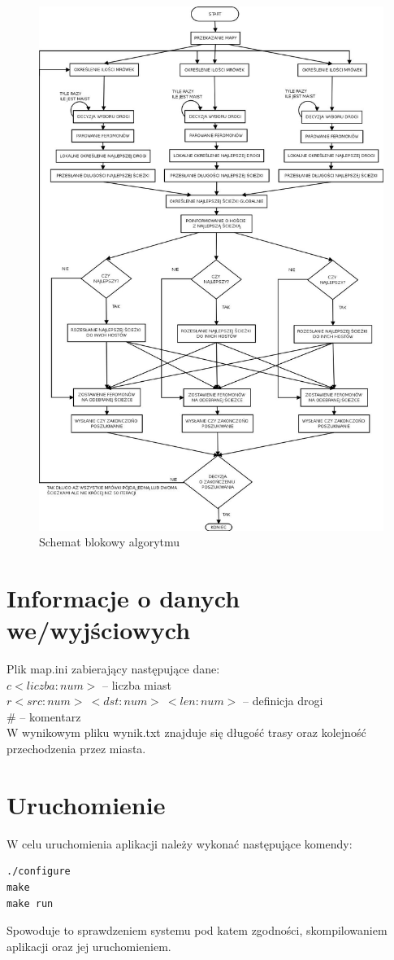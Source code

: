 \documentclass[12pt,a4paper]{article}
\begin{document}
\begin{figure}
\vspace{-4.5cm}
\caption{Schemat blokowy algorytmu}
\label{fig:schemat}
\hspace{-2cm}
\includegraphics[scale=0.5]{schemat.png}
\end{figure}
\section{Informacje o danych we/wyjściowych}
Plik map.ini zabierający następujące dane:\\
$c <liczba:num>$ -- liczba miast\\
$r <src:num>\ <dst:num>\ <len:num>$ -- definicja drogi\\
$\#$ -- komentarz\\
W wynikowym pliku wynik.txt znajduje się długość trasy oraz kolejność przechodzenia przez miasta. 
\section{Uruchomienie}
W celu uruchomienia aplikacji należy wykonać następujące komendy:
\begin{verbatim}
./configure
make
make run
\end{verbatim}
Spowoduje to sprawdzeniem systemu pod katem zgodności, skompilowaniem aplikacji oraz jej uruchomieniem.
\end{document}
